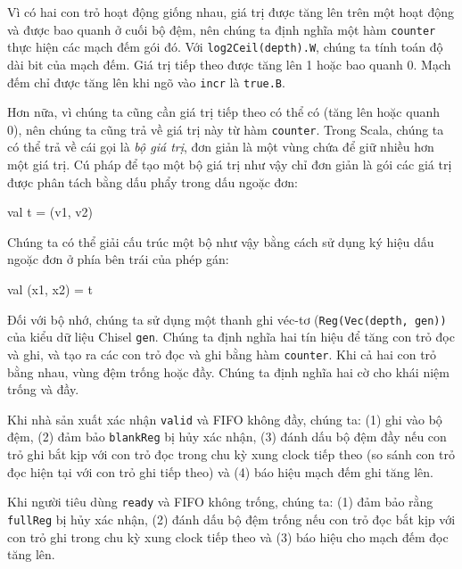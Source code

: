 \documentclass[%
    10pt,
    headinclude, footexclude,
    openright, %
    notitlepage,
    cleardoubleempty,
    headsepline,
    pointlessnumbers,
    bibtotoc, idxtotoc,
    ]{scrbook}
\newcommand{\code}[1]{{\small{\texttt{#1}}}}
\begin{document}

Vì có hai con trỏ hoạt động giống nhau, giá trị được tăng lên trên một hoạt động và được bao quanh ở cuối bộ đệm, nên chúng ta định nghĩa một hàm \code{counter} thực hiện các mạch đếm gói đó. Với \code{log2Ceil(depth).W}, chúng ta tính toán độ dài bit của mạch đếm. Giá trị tiếp theo được tăng lên 1 hoặc bao quanh 0. Mạch đếm chỉ được tăng lên khi ngõ vào \code{incr} là \code{true.B}.

Hơn nữa, vì chúng ta cũng cần giá trị tiếp theo có thể có (tăng lên hoặc quanh 0), nên chúng ta cũng trả về giá trị này từ hàm \code{counter}. Trong Scala, chúng ta có thể trả về cái gọi là \emph{bộ giá trị}, đơn giản là một vùng chứa để giữ nhiều hơn một giá trị. Cú pháp để tạo một bộ giá trị như vậy chỉ đơn giản là gói các giá trị được phân tách bằng dấu phẩy trong dấu ngoặc đơn: 


\begin{chisel}
  val t = (v1, v2)
\end{chisel}

\noindent Chúng ta có thể giải cấu trúc một bộ như vậy bằng cách sử dụng ký hiệu dấu ngoặc đơn ở phía bên trái của phép gán: 

\begin{chisel}
val (x1, x2) = t
\end{chisel}

Đối với bộ nhớ, chúng ta sử dụng một thanh ghi véc-tơ (\code{Reg(Vec(depth, gen))} của kiểu dữ liệu Chisel \code{gen}. Chúng ta định nghĩa hai tín hiệu để tăng con trỏ đọc và ghi, và tạo ra các con trỏ đọc và ghi bằng hàm \code{counter}. Khi cả hai con trỏ bằng nhau, vùng đệm trống hoặc đầy. Chúng ta định nghĩa hai cờ cho khái niệm trống và đầy.

Khi nhà sản xuất xác nhận \code{valid} và FIFO không đầy, chúng ta:
(1) ghi vào bộ đệm, (2) đảm bảo \code{blankReg} bị hủy xác nhận,
(3) đánh dấu bộ đệm đầy nếu con trỏ ghi bắt kịp với con trỏ đọc trong chu kỳ xung clock tiếp theo (so sánh con trỏ đọc hiện tại với con trỏ ghi tiếp theo) và (4) báo hiệu mạch đếm ghi tăng lên.

Khi người tiêu dùng \code{ready} và FIFO không trống, chúng ta:
(1) đảm bảo rằng \code{fullReg} bị hủy xác nhận, 
(2) đánh dấu bộ đệm trống nếu con trỏ đọc bắt kịp với con trỏ ghi trong chu kỳ xung clock tiếp theo và (3) báo hiệu cho mạch đếm đọc tăng lên. 
\end{document}
